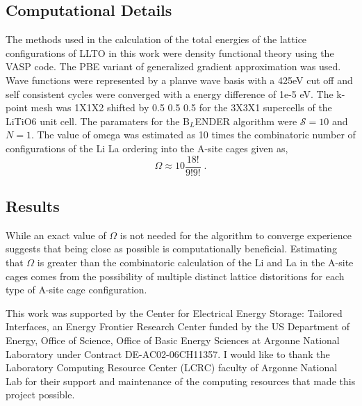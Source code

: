\documentclass[aps,prl,reprint,superscriptaddress,showkeys]{revtex4-1}
\begin{document}
\subsection{Computational Details}
The methods used in the calculation of the total energies of the lattice configurations of LLTO in this work were density functional theory using the VASP code. The PBE variant of generalized gradient approximation was used.  Wave functions were represented by a planve wave basis with a 425eV cut off and self consistent cycles were converged with a energy difference of 1e-5 eV. The k-point mesh was 1X1X2 shifted by 0.5 0.5 0.5 for the 3X3X1 supercells of the LiTiO6 unit cell. The paramaters for the B$_L$ENDER algorithm were $\mathcal{S}=10$ and $N=1$. The value of omega was estimated as 10 times the combinatoric number of configurations of the Li La ordering into the A-site cages given as, 
\begin{equation}
\Omega \approx 10\frac{18!}{9!9!} \;.
\end{equation}
\subsection{Results}
While an exact value of $\Omega$ is not needed for the algorithm to converge experience suggests that being close as possible is computationally beneficial. Estimating that $\Omega$ is greater than the combinatoric calculation of the Li and La in the A-site cages comes from the possibility of multiple distinct lattice distoritions for each type of A-site cage configuration. 


\begin{acknowledgments}
This work was supported by the Center for Electrical Energy Storage: Tailored Interfaces, an Energy Frontier Research Center funded 
by the US Department of Energy, Office of Science, Office of Basic Energy Sciences at Argonne National Laboratory under Contract DE-AC02-06CH11357.
I would like to thank the Laboratory Computing Resource Center (LCRC) faculty of Argonne National Lab for their support and maintenance of the computing resources that made this project possible. 
\end{acknowledgments}


\end{document}
